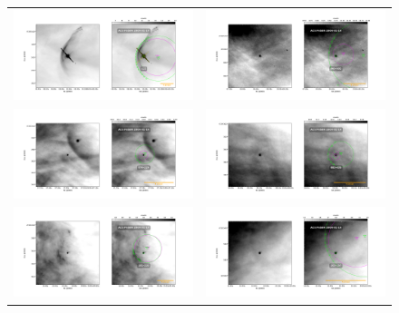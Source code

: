 \documentclass{article}
\begin{document}
\begin{figure}[htp]
\centering
\begin{tabular}{l l}
   \includegraphics[width=0.5\linewidth]{j8oc01010_wcs/LL1-Bally_01-images.pdf}
   &\includegraphics[width=0.5\linewidth]{j8oc01010_wcs/065-502-Bally_01-images.pdf}\\
   \includegraphics[width=0.5\linewidth]{j8oc01010_wcs/074-229-Bally_01-images.pdf}
   &\includegraphics[width=0.5\linewidth]{j8oc01010_wcs/083-435-Bally_01-images.pdf}\\
   \includegraphics[width=0.5\linewidth]{j8oc01010_wcs/101-233-Bally_01-images.pdf}
   &\includegraphics[width=0.5\linewidth]{j8oc01010_wcs/102-157-Bally_01-images.pdf}\\
\end{tabular}
\end{figure}
\end{document}
